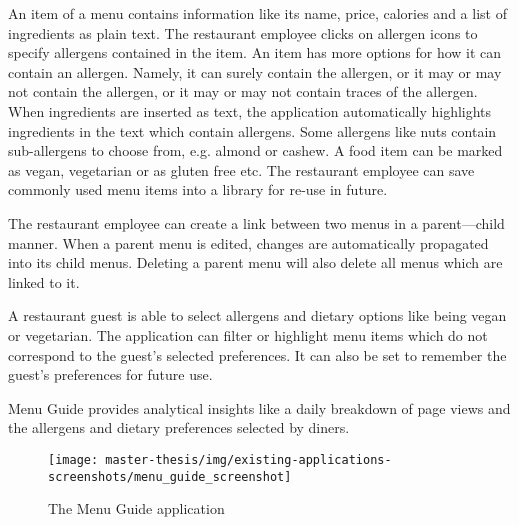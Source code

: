   An item of a menu contains information like its name, price, calories and a list of ingredients as plain text.
  The restaurant employee clicks on allergen icons to specify allergens contained in the item.
  An item has more options for how it can contain an allergen. 
  Namely, it can surely contain the allergen, or it may or may not contain the allergen, or it may or may not contain traces of the allergen.
  When ingredients are inserted as text, the application automatically highlights ingredients in the text which contain allergens.
  Some allergens like nuts contain sub-allergens to choose from, e.g. almond or cashew.
  A food item can be marked as vegan, vegetarian or as gluten free etc.
  The restaurant employee can save commonly used menu items into a library for re-use in future. 

  The restaurant employee can create a link between two menus in a parent---child manner.
  When a parent menu is edited, changes are automatically propagated into its child menus.
  Deleting a parent menu will also delete all menus which are linked to it.

  A restaurant guest is able to select allergens and dietary options like being vegan or vegetarian.
  The application can filter or highlight menu items which do not correspond to the guest's selected preferences.
  It can also be set to remember the guest's preferences for future use.

  Menu Guide provides analytical insights like a daily breakdown of page views and the allergens and dietary preferences selected by diners.

  \begin{figure}[h]
    \centering
    \texttt{[image: master-thesis/img/existing-applications-screenshots/menu\_guide\_screenshot]}
    \caption{The Menu Guide application}
  \end{figure}
